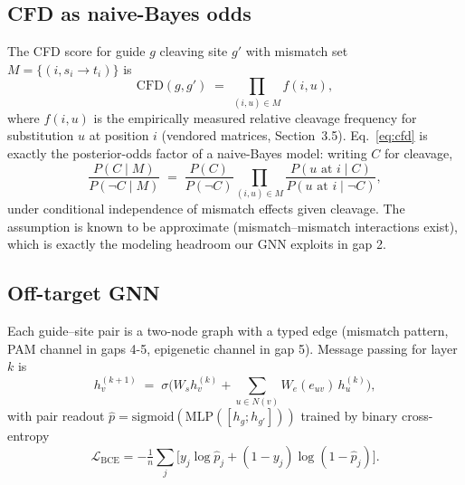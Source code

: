 \subsection{CFD as naive-Bayes odds}
The CFD score for guide $g$ cleaving site $g'$ with mismatch set
$M = \{(i, s_i \!\to\! t_i)\}$ is
\begin{equation}
\mathrm{CFD}(g, g') \;=\; \prod_{(i, u) \in M} f(i, u),
\label{eq:cfd}
\end{equation}
where $f(i, u)$ is the empirically measured relative cleavage frequency
for substitution $u$ at position $i$ (vendored matrices,
Section~3.5). Eq.~\eqref{eq:cfd} is exactly the posterior-odds factor of
a naive-Bayes model: writing $C$ for cleavage,
\begin{equation}
\frac{P(C \mid M)}{P(\neg C \mid M)} \;=\;
\frac{P(C)}{P(\neg C)} \prod_{(i,u)\in M}
\frac{P(u \text{ at } i \mid C)}{P(u \text{ at } i \mid \neg C)},
\label{eq:cfdnb}
\end{equation}
under conditional independence of mismatch effects given cleavage. The
assumption is known to be approximate (mismatch--mismatch interactions
exist), which is exactly the modeling headroom our GNN exploits in
gap 2.

\subsection{Off-target GNN}
Each guide--site pair is a two-node graph with a typed edge (mismatch
pattern, PAM channel in gaps 4-5, epigenetic channel in gap 5). Message
passing for layer $k$ is
\begin{equation}
h_v^{(k+1)} \;=\; \sigma\!\Big( W_s h_v^{(k)} + \!\!\sum_{u \in N(v)}\!\!
W_e(e_{uv})\, h_u^{(k)} \Big),
\label{eq:gnn}
\end{equation}
with pair readout $\hat p = \mathrm{sigmoid}(\mathrm{MLP}([h_g; h_{g'}]))$
trained by binary cross-entropy
\begin{equation}
\mathcal L_{\mathrm{BCE}} = -\tfrac{1}{n}\textstyle\sum_j
\big[ y_j \log \hat p_j + (1 - y_j)\log(1 - \hat p_j) \big].
\label{eq:bce}
\end{equation}

